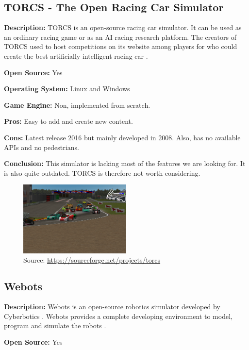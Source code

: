 \subsection{TORCS - The Open Racing Car Simulator}
\textbf{Description:} TORCS is an open-source racing car simulator. It can be used as an ordinary racing game or as an AI racing research platform. The creators of TORCS used to host competitions on its website among players for who could create the best artificially intelligent racing car \cite{TORCS_Racing}. 

\textbf{Open Source:} Yes

\textbf{Operating System:} Linux and Windows

\textbf{Game Engine:} Non, implemented from scratch.

\textbf{Pros:} Easy to add and create new content. 

\textbf{Cons:} Latest release 2016 but mainly developed in 2008. Also, has no available APIs and no pedestrians.

\textbf{Conclusion:} This simulator is lacking most of the features we are looking for. It is also quite outdated. TORCS is therefore not worth considering. 

\begin{figure}[H]
    \centering
    \includegraphics[width=0.5\textwidth]{Simulators/TORCS.png}
    \caption{Source: \url{https://sourceforge.net/projects/torcs}}
\end{figure}

\subsection{Webots}
\textbf{Description:} Webots is an open-source robotics simulator developed by Cyberbotics \cite{Webots_Github}. Webots provides a complete developing environment to model, program and simulate the robots \cite{Webots_home}. 

\textbf{Open Source:} Yes

